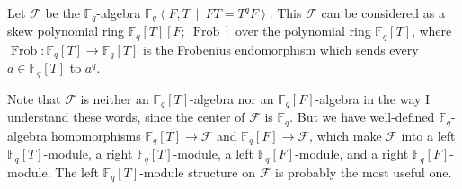 \documentclass[numbers=enddot,12pt,final,onecolumn,notitlepage]{scrartcl}%
\theoremstyle{definition}
\begin{document}
Let $\mathcal{F}$ be the $\mathbb{F}_{q}$-algebra $\mathbb{F}_{q}\left\langle
F,T\ \mid\ FT=T^{q}F\right\rangle $. This $\mathcal{F}$ can be considered as a
skew polynomial ring $\mathbb{F}_{q}\left[  T\right]  \left[
F;\ \operatorname*{Frob}\right]  $ over the polynomial ring $\mathbb{F}%
_{q}\left[  T\right]  $, where $\operatorname*{Frob}:\mathbb{F}_{q}\left[
T\right]  \rightarrow\mathbb{F}_{q}\left[  T\right]  $ is the Frobenius
endomorphism which sends every $a\in\mathbb{F}_{q}\left[  T\right]  $ to
$a^{q}$.

Note that $\mathcal{F}$ is neither an $\mathbb{F}_{q}\left[  T\right]
$-algebra nor an $\mathbb{F}_{q}\left[  F\right]  $-algebra in the way I
understand these words, since the center of $\mathcal{F}$ is $\mathbb{F}_{q}$.
But we have well-defined $\mathbb{F}_{q}$-algebra homomorphisms $\mathbb{F}%
_{q}\left[  T\right]  \rightarrow\mathcal{F}$ and $\mathbb{F}_{q}\left[
F\right]  \rightarrow\mathcal{F}$, which make $\mathcal{F}$ into a left
$\mathbb{F}_{q}\left[  T\right]  $-module, a right $\mathbb{F}_{q}\left[
T\right]  $-module, a left $\mathbb{F}_{q}\left[  F\right]  $-module, and a
right $\mathbb{F}_{q}\left[  F\right]  $-module. The left $\mathbb{F}%
_{q}\left[  T\right]  $-module structure on $\mathcal{F}$ is probably the most
useful one.
\end{document}
